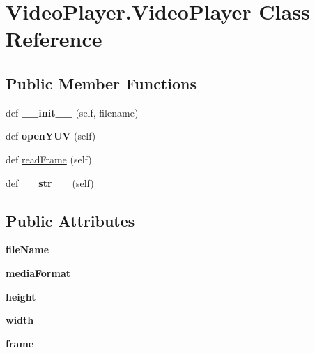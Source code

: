 \hypertarget{classVideoPlayer_1_1VideoPlayer}{}\section{Video\+Player.\+Video\+Player Class Reference}
\label{classVideoPlayer_1_1VideoPlayer}
\subsection*{Public Member Functions}
\begin{DoxyCompactItemize}
\item 
\mbox{\label{classVideoPlayer_1_1VideoPlayer_a6801c672ee290f96a3c282f05300ae0e}} 
def {\bfseries \+\_\+\+\_\+init\+\_\+\+\_\+} (self, filename)
\item 
\mbox{\label{classVideoPlayer_1_1VideoPlayer_a7c638b5a91672d94b8496782cf357dad}} 
def {\bfseries open\+Y\+UV} (self)
\item 
def \hyperlink{classVideoPlayer_1_1VideoPlayer_a794fd22bd9237c8a5fea56aa85f9f878}{read\+Frame} (self)
\item 
\mbox{\label{classVideoPlayer_1_1VideoPlayer_a9097355916b7a6173c8c00075b8b5d73}} 
def {\bfseries \+\_\+\+\_\+str\+\_\+\+\_\+} (self)
\end{DoxyCompactItemize}
\subsection*{Public Attributes}
\begin{DoxyCompactItemize}
\item 
\mbox{\label{classVideoPlayer_1_1VideoPlayer_ada3c69e5301f19b37fd3d00a6a1d037b}} 
{\bfseries file\+Name}
\item 
\mbox{\label{classVideoPlayer_1_1VideoPlayer_ac9c0ceee0885128c321700d70316ce54}} 
{\bfseries media\+Format}
\item 
\mbox{\label{classVideoPlayer_1_1VideoPlayer_a058e596b3330c175f2abb3e81e7fad47}} 
{\bfseries height}
\item 
\mbox{\label{classVideoPlayer_1_1VideoPlayer_a1958568618073fac9854b6d78bcefa7e}} 
{\bfseries width}
\item 
\mbox{\label{classVideoPlayer_1_1VideoPlayer_adfc4d7d441f8bf192a9def285b29ccbe}} 
{\bfseries frame}
\end{DoxyCompactItemize}


